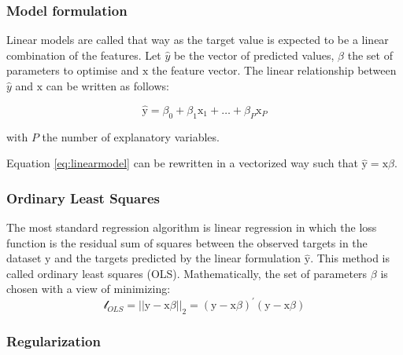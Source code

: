 \documentclass[
]{book}
\begin{document}
\hypertarget{model-formulation}{%
\subsubsection*{Model formulation}\label{model-formulation}}

Linear models are called that way as the target value is expected to be a linear combination of the features. Let \(\hat{y}\) be the vector of predicted values, \(\beta\) the set of parameters to optimise and \(\pmb{\mathrm{x}}\) the feature vector. The linear relationship between \(\hat{y}\) and \(\pmb{\mathrm{x}}\) can be written as follows:

\begin{equation}
  \hat{\mathrm{y}} = \beta_0 + \beta_1 \mathrm{x}_1 + \dots + \beta_P \mathrm{x}_P
  \label{eq:linearmodel}
\end{equation}

with \(P\) the number of explanatory variables.

Equation \eqref{eq:linearmodel} can be rewritten in a vectorized way such that \(\hat{\mathrm{y}} = \pmb{\mathrm{x}}\beta\).

\hypertarget{ordinary-least-squares}{%
\subsubsection*{Ordinary Least Squares}\label{ordinary-least-squares}}

The most standard regression algorithm is linear regression in which the loss function is the residual sum of squares between the observed targets in the dataset \(\mathrm{y}\) and the targets predicted by the linear formulation \(\hat{\mathrm{y}}\). This method is called ordinary least squares (OLS). Mathematically, the set of parameters \(\beta\) is chosen with a view of minimizing:
\begin{equation}
  \mathcal{l}_{OLS} = ||\mathrm{y} - \pmb{\mathrm{x}}\beta||_2 = (\mathrm{y} - \pmb{\mathrm{x}}\beta)^{'}(\mathrm{y} - \pmb{\mathrm{x}}\beta)
  \label{eq:ols}
\end{equation}

\hypertarget{regularization}{%
\subsubsection*{Regularization}\label{regularization}}
\end{document}
